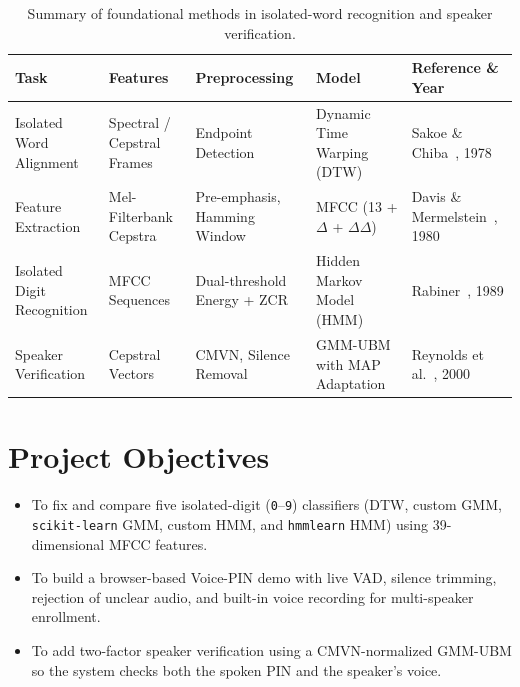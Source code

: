 \documentclass[12pt,a4paper]{article}
\begin{document}
\begin{table}[h!]
\centering
\caption{Summary of foundational methods in isolated-word recognition and speaker verification.}
\label{tab:related_works}
\small
\begin{tabular}{p{2.4cm} p{2.3cm} p{2.6cm} p{2.5cm} p{3.2cm}}
\toprule
\textbf{Task} & \textbf{Features} & \textbf{Preprocessing} & \textbf{Model} & \textbf{Reference \& Year} \\
\midrule
Isolated Word Alignment & Spectral / Cepstral Frames & Endpoint Detection & Dynamic Time Warping (DTW) & Sakoe \& Chiba~\cite{sakoe1978dynamic}, 1978 \\
Feature Extraction & Mel-Filterbank Cepstra & Pre-emphasis, Hamming Window & MFCC (13 + $\Delta$ + $\Delta\Delta$) & Davis \& Mermelstein~\cite{davis1980comparison}, 1980 \\
Isolated Digit Recognition & MFCC Sequences & Dual-threshold Energy + ZCR & Hidden Markov Model (HMM) & Rabiner~\cite{rabiner1989tutorial}, 1989 \\
Speaker Verification & Cepstral Vectors & CMVN, Silence Removal & GMM-UBM with MAP Adaptation & Reynolds et al.~\cite{reynolds2000speaker}, 2000 \\
\bottomrule
\end{tabular}
\end{table}

\section{Project Objectives}
\begin{itemize}
    \item To fix and compare five isolated-digit (\texttt{0}--\texttt{9}) classifiers (DTW, custom GMM, \texttt{scikit-learn} GMM, custom HMM, and \texttt{hmmlearn} HMM) using 39-dimensional MFCC features.
    \item To build a browser-based Voice-PIN demo with live VAD, silence trimming, rejection of unclear audio, and built-in voice recording for multi-speaker enrollment.
    \item To add two-factor speaker verification using a CMVN-normalized GMM-UBM so the system checks both the spoken PIN and the speaker's voice.
\end{itemize}
\end{document}
